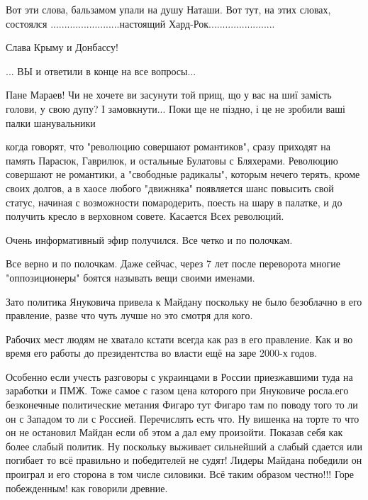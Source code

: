 \begin{itemize}

Вот эти слова, бальзамом упали на душу Наташи. Вот тут, на этих словах,
состоялся .........................настоящий Хард-Рок........................

Слава Крыму и Донбассу!

... ВЫ и ответили в конце на все вопросы...


Пане Мараев! Чи не хочете ви засунути той прищ, що у вас на шиї замість голови,
у свою дупу? І замовкнути... Поки ще не піздно, і це не зробили ваші палки
шанувальники


когда говорят, что "революцию совершают романтиков", сразу приходят на память
Парасюк, Гаврилюк, и остальные Булатовы с Бляхерами.  Революцию совершают не
романтики, а "свободные радикалы", которым нечего терять, кроме своих долгов, а
в хаосе любого "движняка" появляется шанс повысить свой статус, начиная с
возможности помародерить, поесть на шару в палатке, и до получить кресло в
верховном совете.  Касается Всех революций.

Очень информативный эфир получился. Все четко и по полочкам.

Все верно и по полочкам. Даже сейчас, через 7 лет после переворота многие "оппозиционеры" боятся называть вещи своими именами.


Зато политика Януковича привела к Майдану поскольку не было безоблачно в его
правление, разве что чуть лучше но это смотря для кого.

Рабочих мест людям не хватало кстати всегда как раз в его правление. Как и во
время его работы до президентства во власти ещё на заре 2000-х годов.

\obeycr
Особенно если учесть разговоры с украинцами в России приезжавшими туда на заработки и ПМЖ.
Тоже самое с газом цена которого при Януковиче росла.его безконечные политические метания Фигаро тут Фигаро там по поводу того то ли он с Западом то ли с Россией.
Перечислять есть что.
Ну вишенка на торте то что он не остановил Майдан если об этом а дал ему произойти.
Показав себя как более слабый политик.
Ну поскольку выживает сильнейший а слабый сдается или погибает то всё правильно и победителей не судят!
Лидеры Майдана победили он проиграл и его сторона в том числе силовики.
Всё таким образом честно!!!
Горе побежденным! как говорили древние.
\restorecr


\end{itemize}
